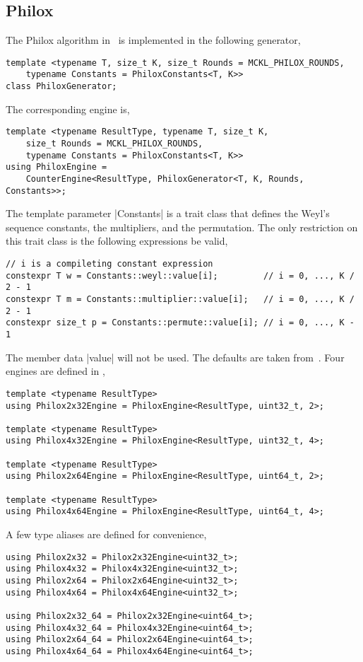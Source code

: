 \subsection{Philox}
\label{sub:Philox}

The Philox algorithm in~\cite{Salmon:2011um} is implemented in the following
generator,
\begin{verbatim}
template <typename T, size_t K, size_t Rounds = MCKL_PHILOX_ROUNDS,
    typename Constants = PhiloxConstants<T, K>>
class PhiloxGenerator;
\end{verbatim}
The corresponding \rng engine is,
\begin{verbatim}
template <typename ResultType, typename T, size_t K,
    size_t Rounds = MCKL_PHILOX_ROUNDS,
    typename Constants = PhiloxConstants<T, K>>
using PhiloxEngine =
    CounterEngine<ResultType, PhiloxGenerator<T, K, Rounds, Constants>>;
\end{verbatim}
The template parameter |Constants| is a trait class that defines the
Weyl's sequence constants, the multipliers, and the permutation. The only
restriction on this trait class is the following expressions be valid,
\begin{verbatim}
// i is a compileting constant expression
constexpr T w = Constants::weyl::value[i];         // i = 0, ..., K / 2 - 1
constexpr T m = Constants::multiplier::value[i];   // i = 0, ..., K / 2 - 1
constexpr size_t p = Constants::permute::value[i]; // i = 0, ..., K - 1
\end{verbatim}
The member data |value| will not be \odr used. The defaults are taken
from~\cite{Salmon:2011um}. Four engines are defined in \mckl,
\begin{verbatim}
template <typename ResultType>
using Philox2x32Engine = PhiloxEngine<ResultType, uint32_t, 2>;

template <typename ResultType>
using Philox4x32Engine = PhiloxEngine<ResultType, uint32_t, 4>;

template <typename ResultType>
using Philox2x64Engine = PhiloxEngine<ResultType, uint64_t, 2>;

template <typename ResultType>
using Philox4x64Engine = PhiloxEngine<ResultType, uint64_t, 4>;
\end{verbatim}
A few type aliases are defined for convenience,
\begin{verbatim}
using Philox2x32 = Philox2x32Engine<uint32_t>;
using Philox4x32 = Philox4x32Engine<uint32_t>;
using Philox2x64 = Philox2x64Engine<uint32_t>;
using Philox4x64 = Philox4x64Engine<uint32_t>;

using Philox2x32_64 = Philox2x32Engine<uint64_t>;
using Philox4x32_64 = Philox4x32Engine<uint64_t>;
using Philox2x64_64 = Philox2x64Engine<uint64_t>;
using Philox4x64_64 = Philox4x64Engine<uint64_t>;
\end{verbatim}

